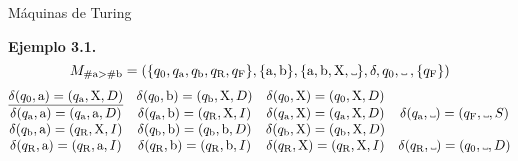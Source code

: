 \documentclass[10pt,xcolor=dvipsnames,aspectratio=169,spanish]{beamer}
\newcommand\Vtextvisiblespace[1][.3em]{%
\mbox{\kern.06em\vrule height.3ex}%
\vbox{\hrule width#1}%
\hbox{\vrule height.3ex}}
\begin{document}
\begin{frame}{Máquinas de Turing}

\textbf{Ejemplo 3.1}\textbf{.}
$$
    M_{\#\text{a}>\#\text{b}}=(\{q_0, q_\text{a}, q_\text{b}, q_\text{R}, q_\text{F}\}, \{\text{a}, \text{b}\}, \{\text{a}, \text{b}, \text{X}, \Vtextvisiblespace\}, \delta, q_0, \Vtextvisiblespace\:,\{q_\text{F}\})
$$
$$
    \begin{matrix}
        \underline{\delta(q_0, \text{a}) = (q_\text{a},\text{X},D)} & \delta(q_0, \text{b}) = (q_\text{b},\text{X},D) & \delta(q_0, \text{X}) = (q_0,\text{X},D) &  \\
        \delta(q_\text{a}, \text{a}) = (q_\text{a},\text{a},D) & \delta(q_\text{a}, \text{b}) = (q_\text{R},\text{X},I) & \delta(q_\text{a}, \text{X}) = (q_\text{a},\text{X},D) & \delta(q_\text{a}, \Vtextvisiblespace) = (q_\text{F},\Vtextvisiblespace,S) \\
        \delta(q_\text{b}, \text{a}) = (q_\text{R},\text{X},I) & \delta(q_\text{b}, \text{b}) = (q_\text{b},\text{b},D) & \delta(q_\text{b}, \text{X}) = (q_\text{b},\text{X},D) &  \\
        \delta(q_\text{R}, \text{a}) = (q_\text{R},\text{a},I) & \delta(q_\text{R}, \text{b}) = (q_\text{R},\text{b},I) & \delta(q_\text{R}, \text{X}) = (q_\text{R},\text{X},I) & \delta(q_\text{R}, \Vtextvisiblespace) = (q_0,\Vtextvisiblespace,D) \\
    \end{matrix}
$$

\vspace{5mm}

\begin{adjustbox}{max height={.67\textheight},center}

\end{adjustbox}

\end{frame}
\end{document}
